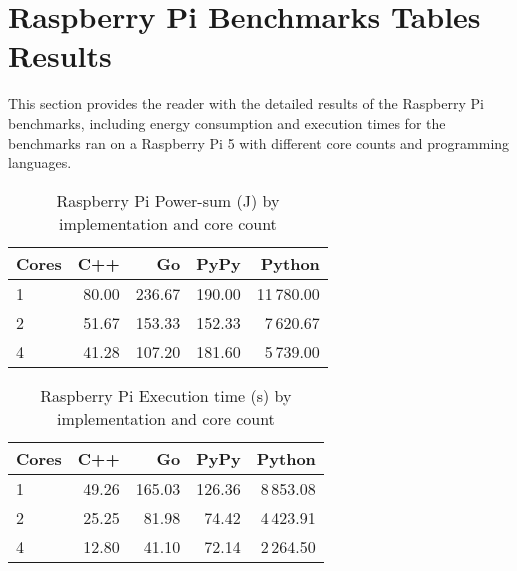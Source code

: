 \section{Raspberry Pi Benchmarks Tables Results}

This section provides the reader with the detailed results of the Raspberry Pi benchmarks, including energy consumption and execution times for the benchmarks ran on a Raspberry Pi 5 with different core counts and programming languages.

\begin{table}[H]
    \centering
    \begin{tabular}{lrrrr}
        \hline
        Cores & C++    & Go      & PyPy         & Python      \\
        \hline
        1     & 80.00  & 236.67  & 190.00       & 11\,780.00  \\
        2     & 51.67  & 153.33  & 152.33       &  7\,620.67  \\
        4     & 41.28  & 107.20  & 181.60       &  5\,739.00  \\
        \hline
    \end{tabular}
\caption{Raspberry Pi Power-sum (J) by implementation and core count}
\label{tab:power-sum-by-cores}
\end{table}

\begin{table}[H]
    \centering
    \begin{tabular}{lrrrr}
        \hline
        Cores & C++    & Go      & PyPy         & Python      \\
        \hline
        1     & 49.26  & 165.03  & 126.36       & 8\,853.08   \\
        2     & 25.25  &  81.98  &  74.42       & 4\,423.91   \\
        4     & 12.80  &  41.10  &  72.14       & 2\,264.50   \\
        \hline
    \end{tabular}
\caption{Raspberry Pi Execution time (s) by implementation and core count}
\label{tab:execution-time-by-cores}
\end{table}